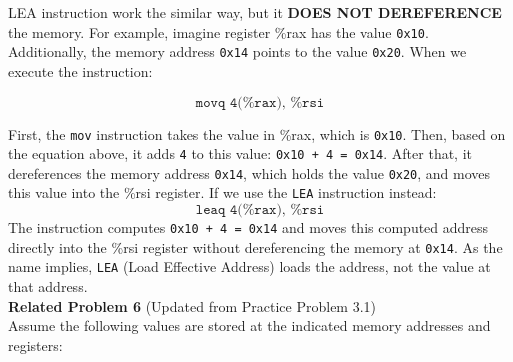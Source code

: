 \documentclass{article}
\begin{document}
LEA instruction work the similar way, but it \textbf{DOES NOT DEREFERENCE} the memory.
For example, imagine register \%rax has the value \texttt{0x10}. Additionally, the memory address \texttt{0x14} points to the value \texttt{0x20}. When we execute the instruction:

\[
\texttt{movq 4(\%rax), \%rsi}
\]

First, the \texttt{mov} instruction takes the value in \%rax, which is \texttt{0x10}. Then, based on the equation above,  it adds \texttt{4} to this value: \texttt{0x10 + 4 = 0x14}. After that, it dereferences the memory address \texttt{0x14}, which holds the value \texttt{0x20}, and moves this value into the \%rsi register.
If we use the \texttt{LEA} instruction instead:
\[
\texttt{leaq 4(\%rax), \%rsi}
\]
The instruction computes \texttt{0x10 + 4 = 0x14} and moves this computed address directly into the \%rsi register without dereferencing the memory at \texttt{0x14}. As the name implies, \texttt{LEA} (Load Effective Address) loads the address, not the value at that address.
\\

\noindent\textbf{Related Problem 6} (Updated from Practice Problem 3.1) \\
Assume the following values are stored at the indicated memory addresses and registers:
\end{document}

